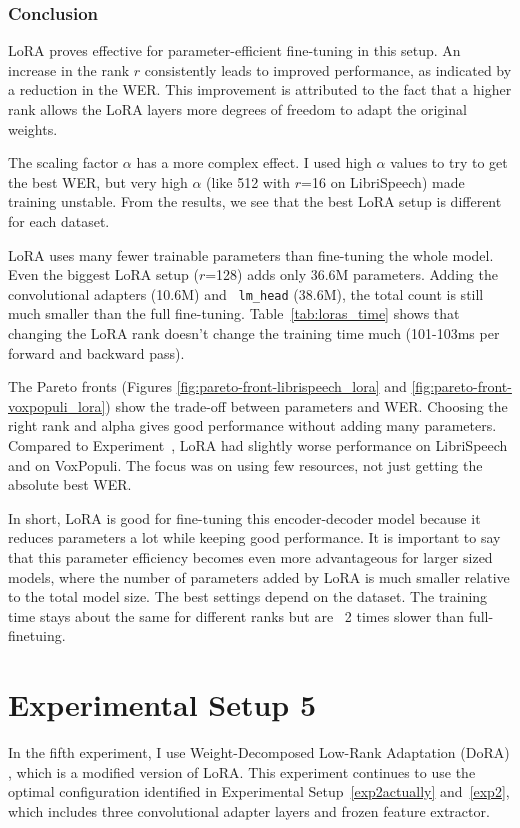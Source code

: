 \subsubsection{Conclusion}

LoRA proves effective for parameter-efficient fine-tuning in this setup. An increase in the rank $r$ consistently leads to improved performance, as indicated by a reduction in the WER. This improvement is attributed to the fact that a higher rank allows the LoRA layers more degrees of freedom to adapt the original weights.


The scaling factor \( \alpha \) has a more complex effect. I used high \( \alpha \) values to try to get the best WER, but very high \( \alpha \) (like 512 with $r$=16 on LibriSpeech) made training unstable. From the results, we see that the best LoRA setup is different for each dataset.

LoRA uses many fewer trainable parameters than fine-tuning the whole model. Even the biggest LoRA setup (\( r \)=128) adds only 36.6M parameters. Adding the convolutional adapters (10.6M) and \texttt{ lm\_head} (38.6M), the total count is still much smaller than the full fine-tuning. Table~\ref{tab:loras_time} shows that changing the LoRA rank doesn't change the training time much (101-103ms per forward and backward pass).

The Pareto fronts (Figures \ref{fig:pareto-front-librispeech_lora} and \ref{fig:pareto-front-voxpopuli_lora}) show the trade-off between parameters and WER. Choosing the right rank and alpha gives good performance without adding many parameters. Compared to Experiment~\label{exp2actually}, LoRA had slightly worse performance on LibriSpeech and on VoxPopuli. The focus was on using few resources, not just getting the absolute best WER.

In short, LoRA is good for fine-tuning this encoder-decoder model because it reduces parameters a lot while keeping good performance. It is important to say that this parameter efficiency becomes even more advantageous for larger sized models, where the number of parameters added by LoRA is much smaller relative to the total model size. The best settings depend on the dataset. The training time stays about the same for different ranks but are ~2 times slower than full-finetuing.

\section{Experimental Setup 5}
In the fifth experiment, I use Weight-Decomposed Low-Rank Adaptation (DoRA) \cite{liu2024dora}, which is a modified version of LoRA. This experiment continues to use the optimal configuration identified in Experimental Setup~\ref{exp2actually} and~\ref{exp2}, which includes three convolutional adapter layers and frozen feature extractor.


